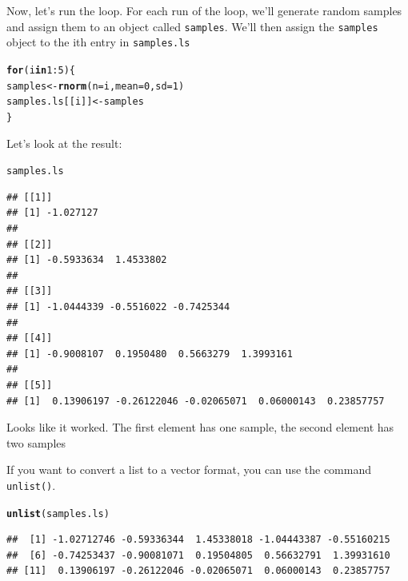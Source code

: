 \documentclass{tufte-book}\usepackage[]{graphicx}\usepackage[]{color}
\makeatletter
\newcommand{\hlnum}[1]{\textcolor[rgb]{0.686,0.059,0.569}{#1}}%
\newcommand{\hlopt}[1]{\textcolor[rgb]{0,0,0}{#1}}%
\newcommand{\hlstd}[1]{\textcolor[rgb]{0.345,0.345,0.345}{#1}}%
\newcommand{\hlkwa}[1]{\textcolor[rgb]{0.161,0.373,0.58}{\textbf{#1}}}%
\newcommand{\hlkwb}[1]{\textcolor[rgb]{0.69,0.353,0.396}{#1}}%
\newcommand{\hlkwc}[1]{\textcolor[rgb]{0.333,0.667,0.333}{#1}}%
\newcommand{\hlkwd}[1]{\textcolor[rgb]{0.737,0.353,0.396}{\textbf{#1}}}%
\newenvironment{kframe}{%
 \def\at@end@of@kframe{}%
 \ifinner\ifhmode%
  \def\at@end@of@kframe{\end{minipage}}%
  \begin{minipage}{\columnwidth}%
 \fi\fi%
 \def\FrameCommand##1{\hskip\@totalleftmargin \hskip-\fboxsep
 \colorbox{shadecolor}{##1}\hskip-\fboxsep
     \hskip-\linewidth \hskip-\@totalleftmargin \hskip\columnwidth}%
 \MakeFramed {\advance\hsize-\width
   \@totalleftmargin\z@ \linewidth\hsize
   \@setminipage}}%
 {\par\unskip\endMakeFramed%
 \at@end@of@kframe}
\newenvironment{knitrout}{}{} %
\makeatother
\begin{document}
\begin{footnotesize}
Now, let's run the loop. For each run of the loop, we'll generate random samples and assign them to an object called \texttt{samples}. We'll then assign the \texttt{samples} object to the ith entry in \texttt{samples.ls}

\begin{knitrout}
\color{fgcolor}\begin{kframe}
\begin{alltt}
\hlkwa{for}\hlstd{(i} \hlkwa{in} \hlnum{1}\hlopt{:}\hlnum{5}\hlstd{) \{}
  \hlstd{samples} \hlkwb{<-} \hlkwd{rnorm}\hlstd{(}\hlkwc{n} \hlstd{= i,} \hlkwc{mean} \hlstd{=} \hlnum{0}\hlstd{,} \hlkwc{sd} \hlstd{=} \hlnum{1}\hlstd{)}
  \hlstd{samples.ls[[i]]} \hlkwb{<-} \hlstd{samples}
\hlstd{\}}
\end{alltt}
\end{kframe}
\end{knitrout}

Let's look at the result:

\begin{knitrout}
\color{fgcolor}\begin{kframe}
\begin{alltt}
\hlstd{samples.ls}
\end{alltt}
\begin{verbatim}
## [[1]]
## [1] -1.027127
## 
## [[2]]
## [1] -0.5933634  1.4533802
## 
## [[3]]
## [1] -1.0444339 -0.5516022 -0.7425344
## 
## [[4]]
## [1] -0.9008107  0.1950480  0.5663279  1.3993161
## 
## [[5]]
## [1]  0.13906197 -0.26122046 -0.02065071  0.06000143  0.23857757
\end{verbatim}
\end{kframe}
\end{knitrout}

Looks like it worked. The first element has one sample, the second element has two samples

If you want to convert a list to a vector format, you can use the command \texttt{unlist()}.

\begin{knitrout}
\color{fgcolor}\begin{kframe}
\begin{alltt}
\hlkwd{unlist}\hlstd{(samples.ls)}
\end{alltt}
\begin{verbatim}
##  [1] -1.02712746 -0.59336344  1.45338018 -1.04443387 -0.55160215
##  [6] -0.74253437 -0.90081071  0.19504805  0.56632791  1.39931610
## [11]  0.13906197 -0.26122046 -0.02065071  0.06000143  0.23857757
\end{verbatim}
\end{kframe}
\end{knitrout}


\end{footnotesize}
\end{document}
